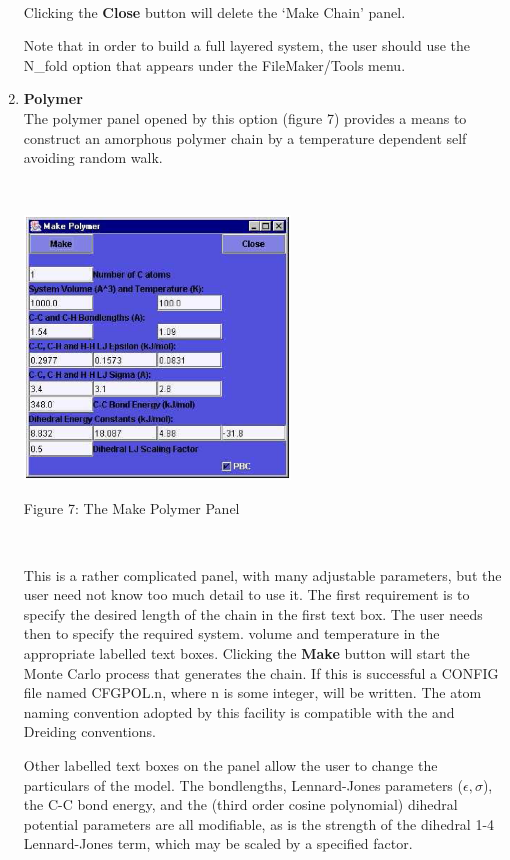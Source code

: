 \begin{enumerate}
~

\noindent
Clicking the {\bf Close} button will delete the `Make Chain'
panel.

Note that in order to build a full layered system, the user should use
the N\_fold option that appears under the FileMaker/Tools menu.

\item {\bf Polymer}\\

The polymer panel opened by this option (figure 7) provides a means to
construct an amorphous polymer chain by a temperature dependent self
avoiding random walk.

~

\vskip 5mm
\centerline{\includegraphics[height=7cm]{polymer.ps}}
\centerline{Figure 7: The Make Polymer Panel}
\vskip 5mm

~

\noindent
This is a rather complicated panel, with many adjustable parameters,
but the user need not know too much detail to use it. The first
requirement is to specify the desired length of the chain in the first
text box. The user needs then to specify the required system.  volume
and temperature in the appropriate labelled text boxes. Clicking the
{\bf Make} button will start the Monte Carlo process that generates
the chain. If this is successful a CONFIG file named CFGPOL.n, where n
is some integer, will be written. The atom naming convention adopted
by this facility is compatible with the \DD{} and Dreiding conventions.

Other labelled text boxes on the panel allow the user to change the
particulars of the model. The bondlengths, Lennard-Jones parameters
($\epsilon,\sigma$), the C-C bond energy, and the (third order cosine
polynomial) dihedral potential parameters are all modifiable, as is
the strength of the dihedral 1-4 Lennard-Jones term, which may be
scaled by a specified factor.


\end{enumerate}
